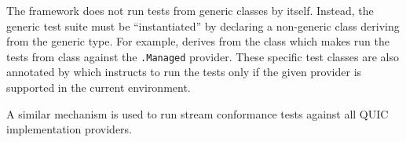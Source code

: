 The \xUnit{} framework does not run tests from generic classes by itself. Instead, the generic test
suite must be ``instantiated'' by declaring a non-generic class deriving from the generic type. For
example,  derives from the
 class which makes
\xUnit{} run the tests from \QuicStreamTests{} class against the
\texttt{\QuicImplementationProviders{}.Managed} provider. These specific test classes are also
annotated by  which instructs \xUnit{} to run the tests only if the
given provider is supported in the current environment.

A similar mechanism is used to run stream conformance tests against all QUIC implementation
providers.
